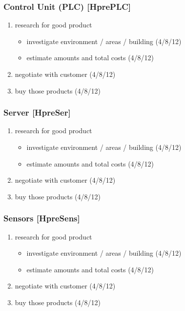 \subsubsection*{Control Unit (PLC) [HprePLC]}
\label{sec:orgd40ef86}
\begin{enumerate}
\item research for good product
\begin{itemize}
\item investigate environment / areas / building (4/8/12)
\item estimate amounts and total costs (4/8/12)
\end{itemize}
\item negotiate with customer (4/8/12)
\item buy those products (4/8/12)
\end{enumerate}

\subsubsection*{Server [HpreSer]}
\label{sec:org7b31fb6}
\begin{enumerate}
\item research for good product
\begin{itemize}
\item investigate environment / areas / building (4/8/12)
\item estimate amounts and total costs (4/8/12)
\end{itemize}
\item negotiate with customer (4/8/12)
\item buy those products (4/8/12)
\end{enumerate}
\subsubsection*{Sensors [HpreSens]}
\label{sec:org6352bec}

\begin{enumerate}
\item research for good product
\begin{itemize}
\item investigate environment / areas / building (4/8/12)
\item estimate amounts and total costs (4/8/12)
\end{itemize}
\item negotiate with customer (4/8/12)
\item buy those products (4/8/12)
\end{enumerate}



